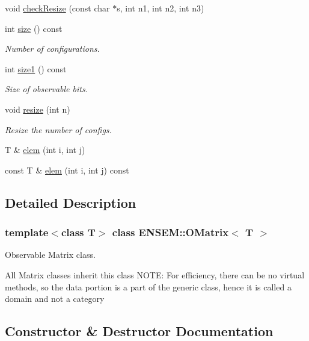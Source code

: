\begin{DoxyCompactItemize}
\item 
void \mbox{\hyperlink{classENSEM_1_1OMatrix_a532d2138ecffc7a153b831401ca8b4df}{check\+Resize}} (const char $\ast$s, int n1, int n2, int n3)
\item 
int \mbox{\hyperlink{classENSEM_1_1OMatrix_a837821b951450cd49d3db25f566f5e47}{size}} () const
\begin{DoxyCompactList}\small\item\em Number of configurations. \end{DoxyCompactList}\item 
int \mbox{\hyperlink{classENSEM_1_1OMatrix_a850b4d2a93be69f82df4a2d0165bc397}{size1}} () const
\begin{DoxyCompactList}\small\item\em Size of observable bits. \end{DoxyCompactList}\item 
void \mbox{\hyperlink{classENSEM_1_1OMatrix_abb999e63b84b6d958e43443dc04e46be}{resize}} (int n)
\begin{DoxyCompactList}\small\item\em Resize the number of configs. \end{DoxyCompactList}\item 
T \& \mbox{\hyperlink{classENSEM_1_1OMatrix_a0a15388ff6dc8159664f6dc14a35b399}{elem}} (int i, int j)
\item 
const T \& \mbox{\hyperlink{classENSEM_1_1OMatrix_a27e0c9e142522126542006530bd7007b}{elem}} (int i, int j) const
\end{DoxyCompactItemize}


\subsection{Detailed Description}
\subsubsection*{template$<$class T$>$\newline
class E\+N\+S\+E\+M\+::\+O\+Matrix$<$ T $>$}

Observable Matrix class. 

All Matrix classes inherit this class N\+O\+TE\+: For efficiency, there can be no virtual methods, so the data portion is a part of the generic class, hence it is called a domain and not a category 

\subsection{Constructor \& Destructor Documentation}
\mbox{\label{classENSEM_1_1OMatrix_a65e880b856888dfd55e3f96b87afa0e7}} 
